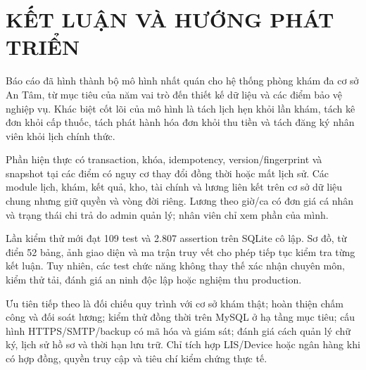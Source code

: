 \chapter*{KẾT LUẬN VÀ HƯỚNG PHÁT TRIỂN}
Báo cáo đã hình thành bộ mô hình nhất quán cho hệ thống phòng khám đa cơ sở An Tâm, từ mục tiêu của năm vai trò đến thiết kế dữ liệu và các điểm bảo vệ nghiệp vụ.\allowbreak{} Khác biệt cốt lõi của mô hình là tách lịch hẹn khỏi lần khám, tách kê đơn khỏi cấp thuốc, tách phát hành hóa đơn khỏi thu tiền và tách đăng ký nhân viên khỏi lịch chính thức.\allowbreak{}

Phần hiện thực có transaction, khóa, idempotency, version/\allowbreak{}fingerprint và snapshot tại các điểm có nguy cơ thay đổi đồng thời hoặc mất lịch sử.\allowbreak{} Các module lịch, khám, kết quả, kho, tài chính và lương liên kết trên cơ sở dữ liệu chung nhưng giữ quyền và vòng đời riêng.\allowbreak{} Lương theo giờ/\allowbreak{}ca có đơn giá cá nhân và trạng thái chi trả do admin quản lý; nhân viên chỉ xem phần của mình.\allowbreak{}

Lần kiểm thử mới đạt 109 test và 2.\allowbreak{}807 assertion trên SQLite cô lập.\allowbreak{} Sơ đồ, từ điển 52 bảng, ảnh giao diện và ma trận truy vết cho phép tiếp tục kiểm tra từng kết luận.\allowbreak{} Tuy nhiên, các test chức năng không thay thế xác nhận chuyên môn, kiểm thử tải, đánh giá an ninh độc lập hoặc nghiệm thu production.\allowbreak{}

Ưu tiên tiếp theo là đối chiếu quy trình với cơ sở khám thật; hoàn thiện chấm công và đối soát lương; kiểm thử đồng thời trên My\allowbreak{}SQL ở hạ tầng mục tiêu; cấu hình HTTPS/\allowbreak{}SMTP/\allowbreak{}backup có mã hóa và giám sát; đánh giá cách quản lý chữ ký, lịch sử hồ sơ và thời hạn lưu trữ.\allowbreak{} Chỉ tích hợp LIS/\allowbreak{}Device hoặc ngân hàng khi có hợp đồng, quyền truy cập và tiêu chí kiểm chứng thực tế.\allowbreak{}

\clearpage
